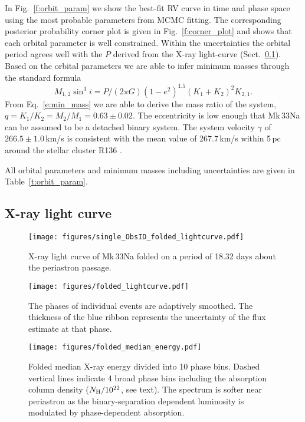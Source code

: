 \documentclass[fleqn,usenatbib]{mnras}
\begin{document}
In Fig.~\ref{f:orbit_param} we show the best-fit RV curve in time and phase space using the most probable parameters from MCMC fitting. The corresponding posterior probability corner plot is given in Fig.~\ref{f:corner_plot} and shows that each orbital parameter is well constrained. Within the uncertainties the orbital period agrees well with the $P$ derived from the X-ray light-curve (Sect.~\ref{X-ray}). Based on the orbital parameters we are able to infer minimum masses 
through the standard formula
\begin{equation}\label{e:min_mass}
M_{1,2} \sin^3 i = P/(2\pi G) (1- e^2)^{1.5} (K_1+ K_2)^2 K_{2,1}.
\end{equation}
From Eq.~\ref{e:min_mass} we are able to derive the mass ratio of the system, $q = K_1/K_2 = M_2/M_1 = 0.63\pm 0.02$. The eccentricity is low enough that Mk\,33Na can be assumed to be a detached binary system. The system velocity $\gamma$ of $266.5\pm 1.0$\,km/s is consistent with the mean value of 267.7\,km/s within 5\,pc around the stellar cluster R136 \citep{henault2012}.

All orbital parameters and minimum masses including uncertainties are given in Table~\ref{t:orbit_param}.

\subsection{X-ray light curve}\label{X-ray}

\begin{figure}
	\texttt{[image: figures/single\_ObsID\_folded\_lightcurve.pdf]}
    \caption{X-ray light curve of Mk\,33Na folded on a period of 18.32 days about the periastron passage.}
    \label{f:lightcurve}
\end{figure}

\begin{figure}
	\texttt{[image: figures/folded\_lightcurve.pdf]}
    \caption{The phases of individual events are adaptively smoothed. The thickness of the blue ribbon represents the uncertainty of the flux estimate at that phase.}
    \label{f:phase_bins}
\end{figure}

\begin{figure}
	\texttt{[image: figures/folded\_median\_energy.pdf]}
    \caption{Folded median X-ray energy divided into 10 phase bins. Dashed vertical lines indicate 4 broad phase bins including the absorption column density ($N_{\rm H} / 10^{22}$, see text). The spectrum is softer near periastron as the binary-separation dependent luminosity is modulated by phase-dependent absorption.}
    \label{f:median_energy}
\end{figure}
\end{document}
